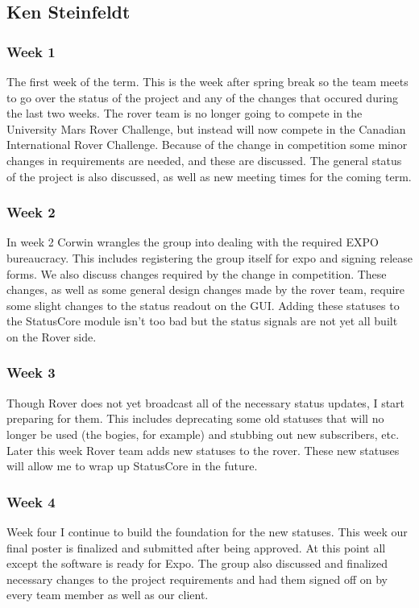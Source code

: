 \subsection{Ken Steinfeldt}
\subsubsection{Week 1}
The first week of the term. 
This is the week after spring break so the team meets to go over the status of the project and any of the changes that occured during the last two weeks.
The rover team is no longer going to compete in the University Mars Rover Challenge, but instead will now compete in the Canadian International Rover Challenge. 
Because of the change in competition some minor changes in requirements are needed, and these are discussed.
The general status of the project is also discussed, as well as new meeting times for the coming term.
\subsubsection{Week 2}
In week 2 Corwin wrangles the group into dealing with the required EXPO bureaucracy.
This includes registering the group itself for expo and signing release forms.
We also discuss changes required by the change in competition. 
These changes, as well as some general design changes made by the rover team, require some slight changes to the status readout on the GUI.
Adding these statuses to the StatusCore module isn't too bad but the status signals are not yet all built on the Rover side.
\subsubsection{Week 3}
Though Rover does not yet broadcast all of the necessary status updates, I start preparing for them.
This includes deprecating some old statuses that will no longer be used (the bogies, for example) and stubbing out new subscribers, etc.
Later this week Rover team adds new statuses to the rover. 
These new statuses will allow me to wrap up StatusCore in the future.
\subsubsection{Week 4}
Week four I continue to build the foundation for the new statuses. 
This week our final poster is finalized and submitted after being approved.
At this point all except the software is ready for Expo. 
The group also discussed and finalized necessary changes to the project requirements and had them signed off on by every team member as well as our client.
